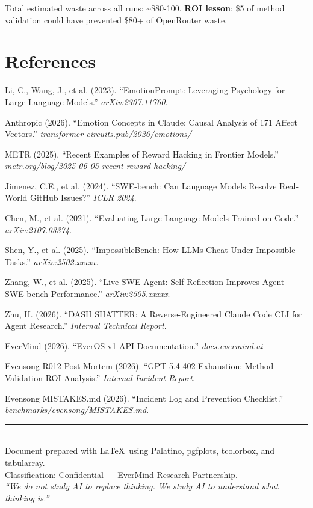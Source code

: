 \documentclass[11pt, a4paper]{article}
\begin{document}
\bigskip

Total estimated waste across all runs: \textasciitilde\$80-100. \textbf{ROI lesson}: \$5 of method validation could have prevented \$80+ of OpenRouter waste.

\section*{References}

\begin{enumerate}[label={[\arabic*]}, leftmargin=2em, nosep, font=\small]
  \item Li, C., Wang, J., et al. (2023). ``EmotionPrompt: Leveraging Psychology for Large Language Models.'' \textit{arXiv:2307.11760}.
  \item Anthropic (2026). ``Emotion Concepts in Claude: Causal Analysis of 171 Affect Vectors.'' \textit{transformer-circuits.pub/2026/emotions/}
  \item METR (2025). ``Recent Examples of Reward Hacking in Frontier Models.'' \textit{metr.org/blog/2025-06-05-recent-reward-hacking/}
  \item Jimenez, C.E., et al. (2024). ``SWE-bench: Can Language Models Resolve Real-World GitHub Issues?'' \textit{ICLR 2024}.
  \item Chen, M., et al. (2021). ``Evaluating Large Language Models Trained on Code.'' \textit{arXiv:2107.03374}.
  \item Shen, Y., et al. (2025). ``ImpossibleBench: How LLMs Cheat Under Impossible Tasks.'' \textit{arXiv:2502.xxxxx}.
  \item Zhang, W., et al. (2025). ``Live-SWE-Agent: Self-Reflection Improves Agent SWE-bench Performance.'' \textit{arXiv:2505.xxxxx}.
  \item Zhu, H. (2026). ``DASH SHATTER: A Reverse-Engineered Claude Code CLI for Agent Research.'' \textit{Internal Technical Report}.
  \item EverMind (2026). ``EverOS v1 API Documentation.'' \textit{docs.evermind.ai}
  \item Evensong R012 Post-Mortem (2026). ``GPT-5.4 402 Exhaustion: Method Validation ROI Analysis.'' \textit{Internal Incident Report}.
  \item Evensong MISTAKES.md (2026). ``Incident Log and Prevention Checklist.'' \textit{benchmarks/evensong/MISTAKES.md}.
\end{enumerate}

\vfill

\begin{center}
{\color{accent}\rule{0.5\textwidth}{0.5pt}}\\[8pt]
{\small\sffamily\color{faded} Document prepared with \LaTeX\ using Palatino, pgfplots, tcolorbox, and tabularray.\\
Classification: Confidential --- EverMind Research Partnership.\\[4pt]
\textit{``We do not study AI to replace thinking. We study AI to understand what thinking is.''}}
\end{center}
\end{document}
